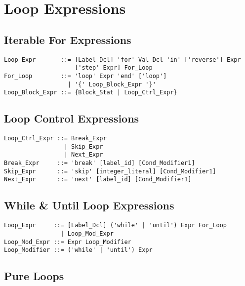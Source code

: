 \section{Loop Expressions}

\subsection{Iterable For Expressions}

\syntax\begin{lstlisting}
Loop_Expr       ::= [Label_Dcl] 'for' Val_Dcl 'in' ['reverse'] Expr 
                    ['step' Expr] For_Loop
For_Loop        ::= 'loop' Expr 'end' ['loop']
                  | '{' Loop_Block_Expr '}'
Loop_Block_Expr ::= {Block_Stat | Loop_Ctrl_Expr}
\end{lstlisting}






\subsection{Loop Control Expressions}

\syntax\begin{lstlisting}
Loop_Ctrl_Expr ::= Break_Expr
                 | Skip_Expr
                 | Next_Expr
Break_Expr     ::= 'break' [label_id] [Cond_Modifier1]
Skip_Expr      ::= 'skip' [integer_literal] [Cond_Modifier1]
Next_Expr      ::= 'next' [label_id] [Cond_Modifier1]
\end{lstlisting}






\subsection{While \& Until Loop Expressions}

\syntax\begin{lstlisting}
Loop_Expr     ::= [Label_Dcl] ('while' | 'until') Expr For_Loop
                | Loop_Mod_Expr
Loop_Mod_Expr ::= Expr Loop_Modifier
Loop_Modifier ::= ('while' | 'until') Expr
\end{lstlisting}





\subsection{Pure Loops}

